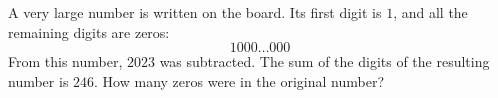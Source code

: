 A very large number is written on the board. Its first digit is $1$, and all the remaining digits are zeros: \[1000\ldots000\]From this number, $2023$ was subtracted. The sum of the digits of the resulting number is $246$. How many zeros were in the original number?
